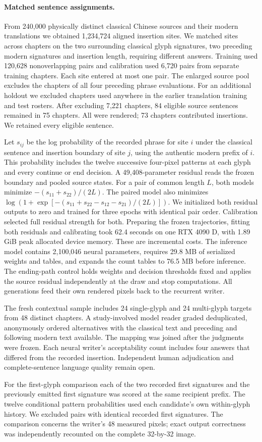 \paragraph{Matched sentence assignments.}
From 240,000 physically distinct classical Chinese sources and their modern translations we obtained 1,234,724 aligned insertion sites. We matched sites across chapters on the two surrounding classical glyph signatures, two preceding modern signatures and insertion length, requiring different answers. Training used 120,628 nonoverlapping pairs and calibration used 6,720 pairs from separate training chapters. Each site entered at most one pair. The enlarged source pool excludes the chapters of all four preceding phrase evaluations. For an additional holdout we excluded chapters used anywhere in the earlier translation training and test rosters. After excluding 7,221 chapters, 84 eligible source sentences remained in 75 chapters. All were rendered; 73 chapters contributed insertions. We retained every eligible sentence.

Let $s_{ij}$ be the log probability of the recorded phrase for site $i$ under the classical sentence and insertion boundary of site $j$, using the authentic modern prefix of $i$. This probability includes the twelve successive four-pixel patterns at each glyph and every continue or end decision. A 49,408-parameter residual reads the frozen boundary and pooled source states. For a pair of common length $L$, both models minimize $-(s_{11}+s_{22})/(2L)$. The paired model also minimizes $\log(1+\exp[-(s_{11}+s_{22}-s_{12}-s_{21})/(2L)])$. We initialized both residual outputs to zero and trained for three epochs with identical pair order. Calibration selected full residual strength for both. Preparing the frozen trajectories, fitting both residuals and calibrating took 62.4 seconds on one RTX 4090 D, with 1.89 GiB peak allocated device memory. These are incremental costs. The inference model contains 2,100,046 neural parameters, requires 29.8 MB of serialized weights and tables, and expands the count tables to 76.5 MB before inference. The ending-path control holds weights and decision thresholds fixed and applies the source residual independently at the draw and stop computations. All generations feed their own rendered pixels back to the recurrent writer.

The fresh contextual sample includes 24 single-glyph and 24 multi-glyph targets from 48 distinct chapters. A study-involved model reader graded deduplicated, anonymously ordered alternatives with the classical text and preceding and following modern text available. The mapping was joined after the judgments were frozen. Each neural writer's acceptability count includes four answers that differed from the recorded insertion. Independent human adjudication and complete-sentence language quality remain open.

For the first-glyph comparison each of the two recorded first signatures and the previously emitted first signature was scored at the same recipient prefix. The twelve conditional pattern probabilities used each candidate's own within-glyph history. We excluded pairs with identical recorded first signatures. The comparison concerns the writer's 48 measured pixels; exact output correctness was independently recounted on the complete 32-by-32 image.
